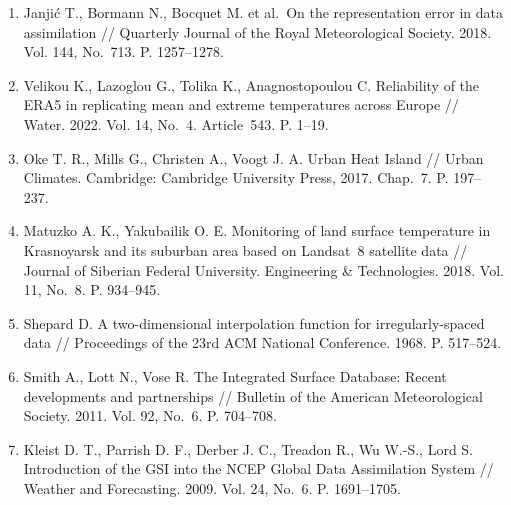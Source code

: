 \documentclass[14pt,a4paper]{extarticle}
\numberwithin{table}{section}
\numberwithin{figure}{section}
\numberwithin{equation}{section}
\begin{document}
\begin{enumerate}
  biomedical image segmentation // Medical Image Computing and
  Computer-Assisted Intervention (MICCAI 2015). Lecture Notes in
  Computer Science. Vol. 9351. Cham: Springer, 2015. P. 234--241.
\item
  Janjić T., Bormann N., Bocquet M. et al.~On the representation error
  in data assimilation // Quarterly Journal of the Royal Meteorological
  Society. 2018. Vol. 144, No.~713. P. 1257--1278.
\item
  Velikou K., Lazoglou G., Tolika K., Anagnostopoulou C. Reliability of
  the ERA5 in replicating mean and extreme temperatures across Europe
  // Water. 2022. Vol. 14, No.~4. Article~543. P. 1--19.
\item
  Oke T. R., Mills G., Christen A., Voogt J. A. Urban Heat Island //
  Urban Climates. Cambridge: Cambridge University Press, 2017.
  Chap.~7. P. 197--237.
\item
  Matuzko A. K., Yakubailik O. E. Monitoring of land surface temperature
  in Krasnoyarsk and its suburban area based on Landsat~8 satellite
  data // Journal of Siberian Federal University. Engineering \&
  Technologies. 2018. Vol. 11, No.~8. P. 934--945.
\item
  Shepard D. A two-dimensional interpolation function for
  irregularly-spaced data // Proceedings of the 23rd ACM National
  Conference. 1968. P. 517--524.
\item
  Smith A., Lott N., Vose R. The Integrated Surface Database: Recent
  developments and partnerships // Bulletin of the American
  Meteorological Society. 2011. Vol. 92, No.~6. P. 704--708.
\item
  Kleist D. T., Parrish D. F., Derber J. C., Treadon R., Wu W.-S.,
  Lord S. Introduction of the GSI into the NCEP Global Data
  Assimilation System // Weather and Forecasting. 2009. Vol. 24,
  No.~6. P. 1691--1705.
\end{enumerate}
\end{document}
